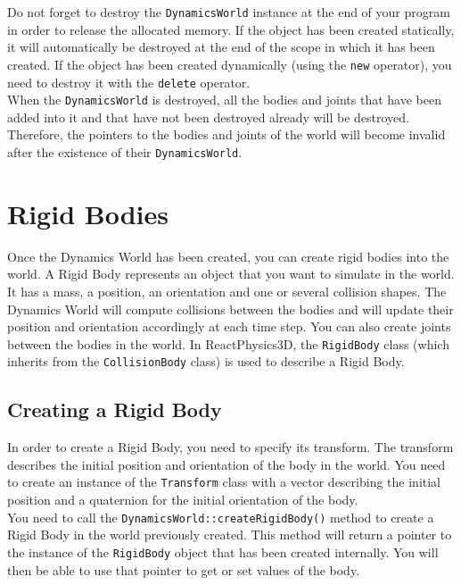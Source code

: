 \documentclass[a4paper,12pt]{article}
\begin{document}
    Do not forget to destroy the \texttt{DynamicsWorld} instance at the end of your program in order to release the allocated memory. If the object has been created
    statically, it will automatically be destroyed at the end of the scope in which it has been created. If the object has been created dynamically (using the
    \texttt{new} operator), you need to destroy it with the \texttt{delete} operator. \\

    When the \texttt{DynamicsWorld} is destroyed, all the bodies and joints that have been added into it and that have not been destroyed already will be destroyed.
    Therefore, the pointers to the bodies and joints of the world will become invalid after the existence of their \texttt{DynamicsWorld}.

    \section{Rigid Bodies}
    \label{sec:rigidbody}

    Once the Dynamics World has been created, you can create rigid bodies into the world. A Rigid Body represents an object that you want to simulate in the world.
    It has a mass, a position, an orientation and one or several collision shapes. The Dynamics World will compute collisions between the bodies and will update their position
    and orientation accordingly at each time step. You can also create joints between the bodies in the world. In ReactPhysics3D, the \texttt{RigidBody} class
    (which inherits from the \texttt{CollisionBody} class) is used to describe a Rigid Body.

    \subsection{Creating a Rigid Body}

    In order to create a Rigid Body, you need to specify its transform. The transform describes the initial
    position and orientation of the body in the world. You need to create an instance of the \texttt{Transform} class with a vector describing the
    initial position and a quaternion for the initial orientation of the body. \\

    You need to call the \texttt{DynamicsWorld::createRigidBody()} method to create a Rigid Body in the world previously created. This method will return a pointer to the
    instance of the \texttt{RigidBody} object that has been created internally. You will then be able to use that pointer to get or set values of the body. \\
\end{document}
